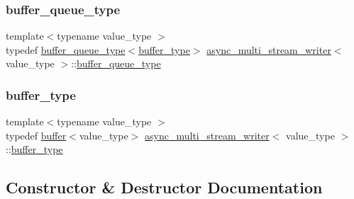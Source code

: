 \subsubsection{\texorpdfstring{buffer\+\_\+queue\+\_\+type}{buffer\_queue\_type}}
{\footnotesize\ttfamily template$<$typename value\+\_\+type $>$ \\
typedef \hyperlink{classasync__multi__stream__writer_a1ac00be81314a643563a45cafe6f8660}{buffer\+\_\+queue\+\_\+type}$<$\hyperlink{classasync__multi__stream__writer_ae11c006e394241a9a5b003a30e8c8c92}{buffer\+\_\+type}$>$ \hyperlink{classasync__multi__stream__writer}{async\+\_\+multi\+\_\+stream\+\_\+writer}$<$ value\+\_\+type $>$\+::\hyperlink{classasync__multi__stream__writer_a1ac00be81314a643563a45cafe6f8660}{buffer\+\_\+queue\+\_\+type}\hspace{0.3cm}{\ttfamily [private]}}

\mbox{\label{classasync__multi__stream__writer_ae11c006e394241a9a5b003a30e8c8c92}} 
\subsubsection{\texorpdfstring{buffer\+\_\+type}{buffer\_type}}
{\footnotesize\ttfamily template$<$typename value\+\_\+type $>$ \\
typedef \hyperlink{structbuffer}{buffer}$<$value\+\_\+type$>$ \hyperlink{classasync__multi__stream__writer}{async\+\_\+multi\+\_\+stream\+\_\+writer}$<$ value\+\_\+type $>$\+::\hyperlink{classasync__multi__stream__writer_ae11c006e394241a9a5b003a30e8c8c92}{buffer\+\_\+type}\hspace{0.3cm}{\ttfamily [private]}}



\subsection{Constructor \& Destructor Documentation}
\mbox{\label{classasync__multi__stream__writer_a7f94653dac5ce376bea3b330942b59b3}} 

